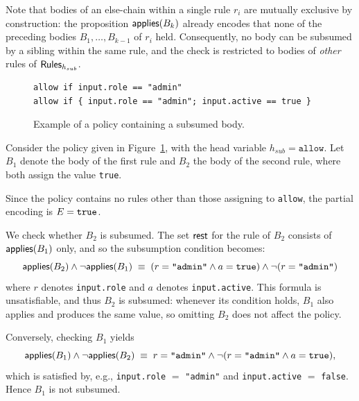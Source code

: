 Note that bodies of an else-chain within a single rule $r_i$ are mutually exclusive by construction: the proposition $\mathsf{applies}(B_k)$ already encodes that none of the preceding bodies $B_1,\ldots,B_{k-1}$ of $r_i$ held.
Consequently, no body can be subsumed by a sibling within the same rule, and the check is restricted to bodies of \emph{other} rules of $\mathsf{Rules}_{h_{sub}}$.

\begin{figure}
  \caption{Example of a \rego policy containing a subsumed body.}
  \label{fig:subsu:ex}
  \begin{lstlisting}[language=Rego]
allow if input.role == "admin"
allow if { input.role == "admin"; input.active == true }
\end{lstlisting}
\end{figure}

\begin{example}
  Consider the policy given in Figure~\ref{fig:subsu:ex}, with the head variable $h_{sub} = \texttt{allow}$.
  Let $B_1$ denote the body of the first rule and $B_2$ the body of the second rule, where both assign the value \texttt{true}.

  Since the policy contains no rules other than those assigning to \texttt{allow}, the partial encoding is $E = \texttt{true}$.

  We check whether $B_2$ is subsumed.
  The set $\mathsf{rest}$ for the rule of $B_2$ consists of $\mathsf{applies}(B_1)$ only, and so the subsumption condition becomes:
  $$\mathsf{applies}(B_2) \land \neg\mathsf{applies}(B_1) \;\equiv\; (r = \texttt{"admin"} \land a = \texttt{true}) \land \neg(r = \texttt{"admin"})$$
  where $r$ denotes \texttt{input.role} and $a$ denotes \texttt{input.active}.
  This formula is unsatisfiable, and thus $B_2$ is subsumed: whenever its condition holds, $B_1$ also applies and produces the same value, so omitting $B_2$ does not affect the policy.

  Conversely, checking $B_1$ yields
  $$\mathsf{applies}(B_1) \land \neg\mathsf{applies}(B_2) \;\equiv\; r = \texttt{"admin"} \land \neg(r = \texttt{"admin"} \land a = \texttt{true}),$$
  which is satisfied by, e.g., \texttt{input.role} $=$ \texttt{"admin"} and \texttt{input.active} $=$ \texttt{false}.
  Hence $B_1$ is not subsumed.
\end{example}

